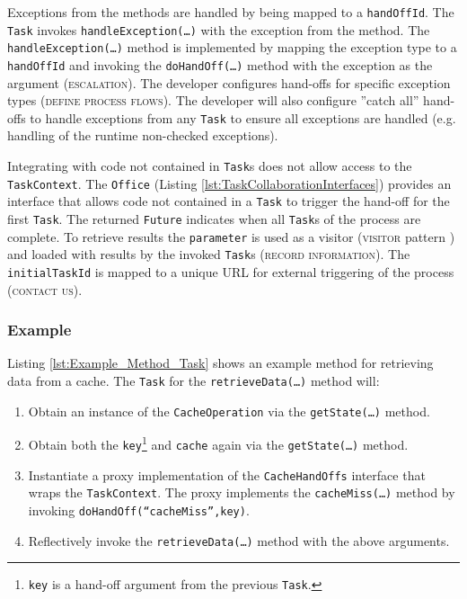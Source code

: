 \documentclass[prodmode]{style/acmlarge}
\begin{document}
Exceptions from the methods are handled by being mapped to a \texttt{handOffId}.
The \texttt{Task} invokes \texttt{handle\-Excep\-tion(\ldots)} with the
exception from the method.  The \texttt{handleException(\ldots)} method is
implemented by mapping the exception type to a \texttt{handOffId} and invoking
the \texttt{doHandOff(\ldots)} method with the exception as the argument
(\textsc{escalation}).  The developer configures hand-offs for specific
exception types (\textsc{define process flows}).  The developer will also
configure ''catch all'' hand-offs to handle exceptions from any \texttt{Task} to
ensure all exceptions are handled (e.g. handling of the runtime non-checked
exceptions).

Integrating with code not contained in \texttt{Task}s does not allow access to
the \texttt{TaskContext}.  The \texttt{Office} (Listing
\ref{lst:TaskCollaborationInterfaces}) provides an interface that allows code
not contained in a \texttt{Task} to trigger the hand-off for the first
\texttt{Task}.  The returned \texttt{Future} indicates when all \texttt{Task}s
of the process are complete.  To retrieve results the \texttt{parameter} is used
as a visitor (\textsc{visitor} pattern \cite{gof}) and loaded with results by
the invoked \texttt{Task}s (\textsc{record information}).  The
\texttt{initialTaskId} is mapped to a unique URL for external triggering of the
process (\textsc{contact us}).



\subsubsection*{Example}

Listing \ref{lst:Example_Method_Task} shows an example method for retrieving
data from a cache.  The \texttt{Task} for the \texttt{retrieve\-Data(\ldots)}
method will:
\begin{enumerate}
  \item Obtain an instance of the \texttt{CacheOperation} via the \texttt{getState(\ldots)} method.
  \item Obtain both the \texttt{key}\footnote{\texttt{key} is a hand-off argument from the previous \texttt{Task}.} and \texttt{cache} again via the \texttt{getState(\ldots)} method.
  \item Instantiate a proxy implementation of the \texttt{CacheHandOffs} interface that wraps the \texttt{TaskContext}.  The proxy implements the \texttt{cacheMiss(\ldots)} method by invoking \texttt{doHandOff(``cacheMiss'',key)}. 
  \item Reflectively invoke the \texttt{retrieveData(\ldots)} method with the above arguments.
\end{enumerate}
\end{document}
